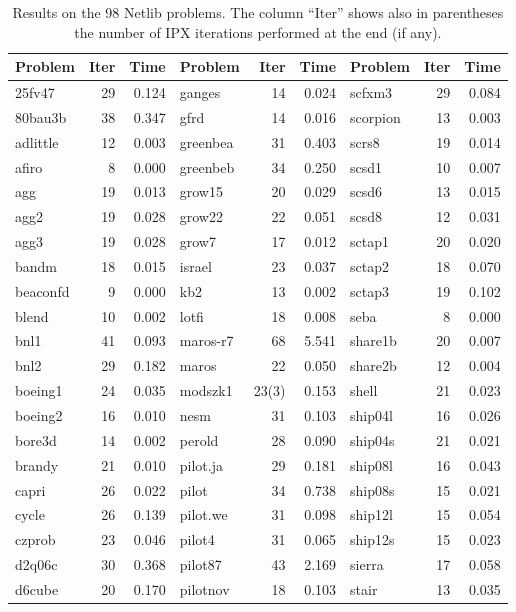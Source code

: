 \documentclass[a4paper]{article}
\newcommand{\0}{\mathbf 0}
\begin{document}
\begin{table}
\tiny
\caption{Results on the 98 Netlib problems. The column ``Iter'' shows also in parentheses the number of IPX iterations performed at the end (if any).}
\label{tab:netlib_results}
\centering
\begin{tabular}{l|rr||l|rr||l|rr}
\toprule
Problem & Iter & Time & Problem & Iter & Time & Problem & Iter & Time \\
\midrule
25fv47 & 29 & 0.124 & ganges & 14 & 0.024 & scfxm3 & 29 & 0.084 \\
80bau3b & 38 & 0.347 & gfrd & 14 & 0.016 & scorpion & 13 & 0.003 \\
adlittle & 12 & 0.003 & greenbea & 31 & 0.403 & scrs8 & 19 & 0.014 \\
afiro & 8 & 0.000 & greenbeb & 34 & 0.250 & scsd1 & 10 & 0.007 \\
agg & 19 & 0.013 & grow15 & 20 & 0.029 & scsd6 & 13 & 0.015 \\
agg2 & 19 & 0.028 & grow22 & 22 & 0.051 & scsd8 & 12 & 0.031 \\
agg3 & 19 & 0.028 & grow7 & 17 & 0.012 & sctap1 & 20 & 0.020 \\
bandm & 18 & 0.015 & israel & 23 & 0.037 & sctap2 & 18 & 0.070 \\
beaconfd & 9 & 0.000 & kb2 & 13 & 0.002 & sctap3 & 19 & 0.102 \\
blend & 10 & 0.002 & lotfi & 18 & 0.008 & seba & 8 & 0.000 \\
bnl1 & 41 & 0.093 & maros-r7 & 68 & 5.541 & share1b & 20 & 0.007 \\
bnl2 & 29 & 0.182 & maros & 22 & 0.050 & share2b & 12 & 0.004 \\
boeing1 & 24 & 0.035 & modszk1 & 23(3) & 0.153 & shell & 21 & 0.023 \\
boeing2 & 16 & 0.010 & nesm & 31 & 0.103 & ship04l & 16 & 0.026 \\
bore3d & 14 & 0.002 & perold & 28 & 0.090 & ship04s & 21 & 0.021 \\
brandy & 21 & 0.010 & pilot.ja & 29 & 0.181 & ship08l & 16 & 0.043 \\
capri & 26 & 0.022 & pilot & 34 & 0.738 & ship08s & 15 & 0.021 \\
cycle & 26 & 0.139 & pilot.we & 31 & 0.098 & ship12l & 15 & 0.054 \\
czprob & 23 & 0.046 & pilot4 & 31 & 0.065 & ship12s & 15 & 0.023 \\
d2q06c & 30 & 0.368 & pilot87 & 43 & 2.169 & sierra & 17 & 0.058 \\
d6cube & 20 & 0.170 & pilotnov & 18 & 0.103 & stair & 13 & 0.035 \\

\end{tabular}
\end{table}
\end{document}
